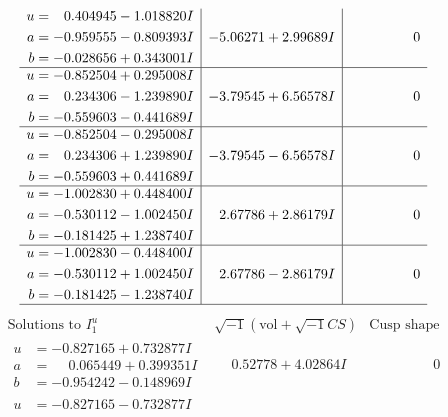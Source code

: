 \documentclass[1p]{elsarticle_modified}
\theoremstyle{definition}
\newcommand{\I}{\sqrt{-1}}
\begin{document}
$$\begin{array}{c|c|c}
\begin{aligned}
u &= \phantom{-}0.404945 - 1.018820 I \\
a &= -0.959555 - 0.809393 I \\
b &= -0.028656 + 0.343001 I\end{aligned}
 & -5.06271 + 2.99689 I & \phantom{-0.000000 } 0 \\ \hline\begin{aligned}
u &= -0.852504 + 0.295008 I \\
a &= \phantom{-}0.234306 - 1.239890 I \\
b &= -0.559603 - 0.441689 I\end{aligned}
 & -3.79545 + 6.56578 I & \phantom{-0.000000 } 0 \\ \hline\begin{aligned}
u &= -0.852504 - 0.295008 I \\
a &= \phantom{-}0.234306 + 1.239890 I \\
b &= -0.559603 + 0.441689 I\end{aligned}
 & -3.79545 - 6.56578 I & \phantom{-0.000000 } 0 \\ \hline\begin{aligned}
u &= -1.002830 + 0.448400 I \\
a &= -0.530112 - 1.002450 I \\
b &= -0.181425 + 1.238740 I\end{aligned}
 & \phantom{-}2.67786 + 2.86179 I & \phantom{-0.000000 } 0 \\ \hline\begin{aligned}
u &= -1.002830 - 0.448400 I \\
a &= -0.530112 + 1.002450 I \\
b &= -0.181425 - 1.238740 I\end{aligned}
 & \phantom{-}2.67786 - 2.86179 I & \phantom{-0.000000 } 0\\
 \hline 
 \end{array}$$\newpage$$\begin{array}{c|c|c}  
\text{Solutions to }I^u_{1}& \I (\text{vol} + \sqrt{-1}CS) & \text{Cusp shape}\\
 \hline 
\begin{aligned}
u &= -0.827165 + 0.732877 I \\
a &= \phantom{-}0.065449 + 0.399351 I \\
b &= -0.954242 - 0.148969 I\end{aligned}
 & \phantom{-}0.52778 + 4.02864 I & \phantom{-0.000000 } 0 \\ \hline\begin{aligned}
u &= -0.827165 - 0.732877 I \\

\end{aligned}
\end{array}$$
\end{document}

